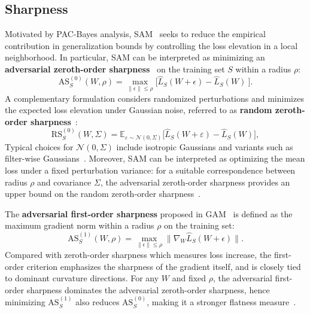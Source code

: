 \documentclass{article}
\theoremstyle{plain}
\theoremstyle{definition}
\theoremstyle{remark}
\begin{document}
\subsection{Sharpness}
Motivated by PAC-Bayes analysis, SAM~\citep{foretSharpnessAwareMinimizationEfficiently2021} seeks to reduce the empirical contribution in generalization bounds by controlling the loss elevation in a local neighborhood. In particular, SAM can be interpreted as minimizing an \textbf{adversarial zeroth-order sharpness}~\citep{AWP2020,foretSharpnessAwareMinimizationEfficiently2021} on the training set $S$ within a radius $\rho$:
{%
\[\mathrm{AS}^{(0)}_S(W,\rho) =\max_{ \| \epsilon \|\leq \rho } \Big[ \hat{L}_{S}(W+{\epsilon})-\hat{L}_{S}(W)\ \Big].\]
}
A complementary formulation considers randomized perturbations and minimizes the expected loss elevation under Gaussian noise, referred to as \textbf{random zeroth-order sharpness}~\citep{liRevisitingRandomWeight2024,jiang2019fantasticgeneralizationmeasures}:
{%
\[
\mathrm{RS}_S^{(0)}({W}, \Sigma)
 =
 \mathbb{E}_{\varepsilon \sim \mathcal{N}(0,\Sigma)}
 \big[
 \hat{L}_{S}({W}+\varepsilon) - \hat{L}_{S}({W})
 \big],
 \]}Typical choices for $\mathcal{N}(0,\Sigma)$ include isotropic Gaussians and variants such as filter-wise Gaussians~\citep{pmlr-v151-bisla22a}. Moreover, SAM can be interpreted as optimizing the mean loss under a fixed perturbation variance: for a suitable correspondence between radius $\rho$ and covariance $\Sigma$, 
 the adversarial zeroth-order sharpness provides an upper bound on the random zeroth-order sharpness~\cite{mollenhoffSAMOptimalRelaxation2022}.

The \textbf{adversarial first-order sharpness} proposed in GAM~\citep{Zhang_GAM} is defined as the maximum gradient norm within a radius $\rho$ on the training set:
{%
\[\mathrm{AS}^{(1)}_S(W,\rho) = \max_{ \| \epsilon \|\leq \rho } \| \nabla_{W} \hat{L}_S(W+\epsilon)\|.\]}Compared with zeroth-order sharpness which measures  loss increase, the first-order criterion emphasizes the sharpness of the gradient itself, and is closely tied to dominant curvature directions. For any $W$ and fixed $\rho$, the adversarial first-order sharpness dominates the adversarial zeroth-order sharpness, hence minimizing $\mathrm{AS}^{(1)}_S$ also reduces $\mathrm{AS}^{(0)}_S$, making it a stronger flatness measure~\citep{Zhang_GAM}.
\end{document}
